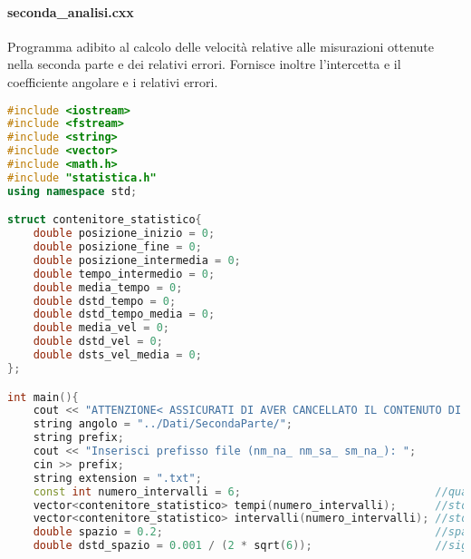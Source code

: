 \documentclass[a4paper,11pt,oneside]{article}
\begin{document}
\paragraph{seconda\_analisi.cxx} Programma adibito al calcolo delle velocità relative alle misurazioni ottenute nella seconda parte e dei relativi errori. Fornisce inoltre l'intercetta e il coefficiente angolare e i relativi errori.
\begin{lstlisting}[language=C++, label=lst:seconda_analisi.cxx, caption=seconda\_analisi.cxx]
#include <iostream>
#include <fstream>
#include <string>
#include <vector>
#include <math.h>
#include "statistica.h"
using namespace std;

struct contenitore_statistico{
    double posizione_inizio = 0;
    double posizione_fine = 0;
    double posizione_intermedia = 0;
    double tempo_intermedio = 0;
    double media_tempo = 0;
    double dstd_tempo = 0;
    double dstd_tempo_media = 0;
    double media_vel = 0;
    double dstd_vel = 0;
    double dsts_vel_media = 0;
};

int main(){
    cout << "ATTENZIONE< ASSICURATI DI AVER CANCELLATO IL CONTENUTO DI ../Stat2/file_errori.txt altimenti si agginguno continuamente righe" << endl;
    string angolo = "../Dati/SecondaParte/";
    string prefix;
    cout << "Inserisci prefisso file (nm_na_ nm_sa_ sm_na_): ";
    cin >> prefix;
    string extension = ".txt";
    const int numero_intervalli = 6;                              //quanti intervalli di spazio ci sono per ogni set
    vector<contenitore_statistico> tempi(numero_intervalli);      //storage di tutte le info dei tempi dai file a stessa angolazione
    vector<contenitore_statistico> intervalli(numero_intervalli); //storage intervalli di tempo per ciascuno spazio e di velocita con relativi errori
    double spazio = 0.2;                                          //spazio fra due rilevatori
    double dstd_spazio = 0.001 / (2 * sqrt(6));                   //sigma spazio con ptl 1mm e deltax 0.5mm


\end{lstlisting}
\end{document}
